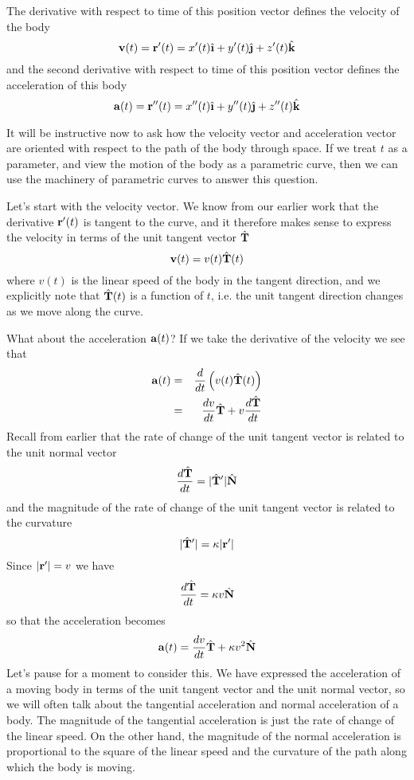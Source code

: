 \documentclass[M3_Night1_Solutions]{subfiles}
\begin{document}
\begin{enumerate}[series=exercises, label=\textbf{Exercise} (\arabic*)]
The derivative with respect to time of this position vector defines the velocity of the body
\[\v(t) = \r'(t) = x'(t) \ihat + y'(t) \jhat + z'(t) \khat \]
and the second derivative with respect to time of this position vector defines the acceleration of this body
\[\a(t) = \r''(t) = x''(t) \ihat + y''(t) \jhat + z''(t) \khat \]

It will be instructive now to ask how the velocity vector and acceleration vector are oriented with respect to the path of the body through space. If we treat $t$ as a parameter, and view the motion of the body as a parametric curve, then we can use the machinery of parametric curves to answer this question.

Let's start with the velocity vector. We know from our earlier work that the derivative $\mathbf{r}'(t)$ is tangent to the curve, and it therefore makes sense to express the velocity in terms of the unit tangent vector $\hat{\mathbf{T}}$
\[\mathbf{v}(t) = v(t) \hat{\mathbf{T}}(t) \]
where $v(t)$ is the linear speed of the body in the tangent direction, and we explicitly note that $\hat{\mathbf{T}}(t)$ is a function of $t$, i.e. the unit tangent direction changes as we move along the curve.

What about the acceleration $\mathbf{a}(t)$? If we take the derivative of the velocity we see that
\begin{eqnarray*}
\mathbf{a}(t) &=& \frac{d}{dt} \left(v(t) \hat{\mathbf{T}}(t) \right) \\
&=& \frac{dv}{dt} \hat{\mathbf{T}} + v \frac{d \hat{\mathbf{T}}}{dt} \\
\end{eqnarray*}
Recall from earlier that the rate of change of the unit tangent vector is related to the unit normal vector
\[ \frac{d \hat{\mathbf{T}}}{dt} = |\hat{\mathbf{T}}'| \hat{\mathbf{N}} \]
and the magnitude of the rate of change of the unit tangent vector is related to the curvature
\[|\hat{\mathbf{T}}'| = \kappa |\mathbf{r}'| \]
Since $|\mathbf{r}'| = v$ we have
\[  \frac{d \hat{\mathbf{T}}}{dt} = \kappa v \hat{\mathbf{N}} \]
so that the acceleration becomes
\[\mathbf{a}(t) = \frac{dv}{dt} \hat{\mathbf{T}} + \kappa v^2 \hat{\mathbf{N}} \]
Let's pause for a moment to consider this. We have expressed the acceleration of a moving body in terms of the unit tangent vector and the unit normal vector, so we will often talk about the tangential acceleration and normal acceleration of a body. The magnitude of the tangential acceleration is just the rate of change of the linear speed. On the other hand, the magnitude of the normal acceleration is proportional to the square of the linear speed and the curvature of the path along which the body is moving.


\end{enumerate}
\end{document}
